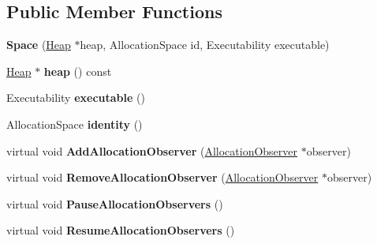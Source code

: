 \subsection*{Public Member Functions}
\begin{DoxyCompactItemize}
\item 
{\bfseries Space} (\hyperlink{classv8_1_1internal_1_1_heap}{Heap} $\ast$heap, Allocation\+Space id, Executability executable)\hypertarget{classv8_1_1internal_1_1_space_a02da0d43509d048946769ac3221fa6d4}{}\label{classv8_1_1internal_1_1_space_a02da0d43509d048946769ac3221fa6d4}

\item 
\hyperlink{classv8_1_1internal_1_1_heap}{Heap} $\ast$ {\bfseries heap} () const \hypertarget{classv8_1_1internal_1_1_space_aa2434e21dfedab7d15316ce88f5ee1a2}{}\label{classv8_1_1internal_1_1_space_aa2434e21dfedab7d15316ce88f5ee1a2}

\item 
Executability {\bfseries executable} ()\hypertarget{classv8_1_1internal_1_1_space_aac4582fa58547eaf2339efa4b39b656c}{}\label{classv8_1_1internal_1_1_space_aac4582fa58547eaf2339efa4b39b656c}

\item 
Allocation\+Space {\bfseries identity} ()\hypertarget{classv8_1_1internal_1_1_space_a934a26e2755bc4f0d8060cfb3d051cdf}{}\label{classv8_1_1internal_1_1_space_a934a26e2755bc4f0d8060cfb3d051cdf}

\item 
virtual void {\bfseries Add\+Allocation\+Observer} (\hyperlink{classv8_1_1internal_1_1_allocation_observer}{Allocation\+Observer} $\ast$observer)\hypertarget{classv8_1_1internal_1_1_space_aa23d402f2d845bc9cbabf622a09a7106}{}\label{classv8_1_1internal_1_1_space_aa23d402f2d845bc9cbabf622a09a7106}

\item 
virtual void {\bfseries Remove\+Allocation\+Observer} (\hyperlink{classv8_1_1internal_1_1_allocation_observer}{Allocation\+Observer} $\ast$observer)\hypertarget{classv8_1_1internal_1_1_space_a923167c327b25f8ec6df7791b6c2bb24}{}\label{classv8_1_1internal_1_1_space_a923167c327b25f8ec6df7791b6c2bb24}

\item 
virtual void {\bfseries Pause\+Allocation\+Observers} ()\hypertarget{classv8_1_1internal_1_1_space_a637f3f47ff9ba1835ef8f6387da9215d}{}\label{classv8_1_1internal_1_1_space_a637f3f47ff9ba1835ef8f6387da9215d}

\item 
virtual void {\bfseries Resume\+Allocation\+Observers} ()\hypertarget{classv8_1_1internal_1_1_space_aa0bf86d80c01b5eaf16888e9b0a1f455}{}\label{classv8_1_1internal_1_1_space_aa0bf86d80c01b5eaf16888e9b0a1f455}


\end{DoxyCompactItemize}
